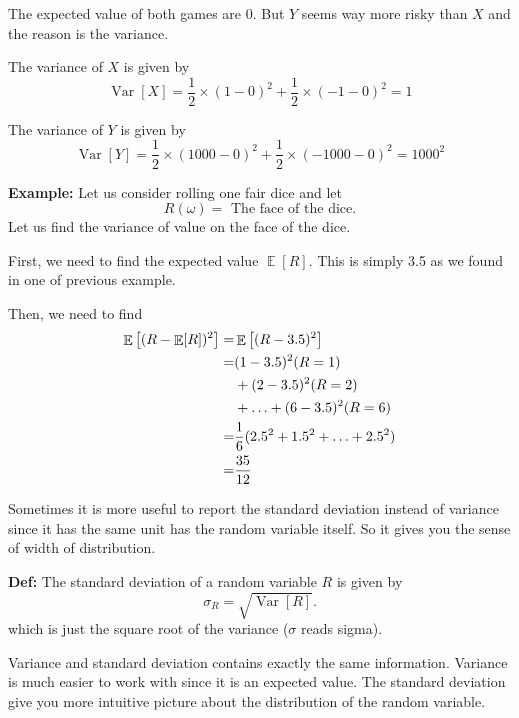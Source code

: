 \documentclass[a4paper, 12pt]{article}
\newcommand{\half}{\ensuremath{\frac{1}{2}}}
\newcommand{\definition}{\vspace{1em}\noindent\textbf{Def:} }
\newcommand{\example}{\vspace{1em}\noindent\textbf{Example:} }
\let\Pr\relax
\DeclareMathOperator{\Pr}{Pr}
\DeclareMathOperator{\E}{\mathbb{E}}
\DeclareMathOperator{\Var}{Var}
\begin{document}
\begin{multicols}{2}
\begin{center}
\end{center}

The expected value of both games are 0. But $Y$ seems way more risky than $X$ and the reason is the variance.

The variance of $X$ is given by
\[
	\Var[X] = \half \times (1-0)^2 + \half \times (-1-0)^2 = 1
\]

The variance of $Y$ is given by
\[
	\Var[Y] = \half \times (1000-0)^2 + \half \times (-1000-0)^2 = 1000^2
\]


\example Let us consider rolling one fair dice and let
\[
	R(\omega) = \text{ The face of the dice.}
\]
Let us find the variance of value on the face of the dice.

First, we need to find the expected value $\E[R]$. This is simply 3.5 as we found in one of previous example.

Then, we need to find
\begin{align*}
	\E\left[(R - \E[R])^2\right] =& \E\left[(R - 3.5)^2\right]\\
	=& (1-3.5)^2 \Pr(R=1)  \\
	&+(2-3.5)^2 \Pr(R=2)  \\
	&+\ldots + (6-3.5)^2 \Pr(R=6)\\
	=& \frac{1}{6} (2.5^2 + 1.5^2 + \ldots + 2.5^2)\\
	= & \frac{35}{12}
\end{align*}

Sometimes it is more useful to report the standard deviation instead of variance since it has the same unit has the random variable itself. So it gives you the sense of width of distribution.

\definition The standard deviation of a random variable $R$ is given by
\[
	\sigma_R = \sqrt{\Var[R]}.
\]
which is just the square root of the variance ($\sigma$ reads sigma).

Variance and standard deviation contains exactly the same information. Variance is much easier to work with since it is an expected value. The standard deviation give you more intuitive picture about the distribution of the random variable.



\end{multicols}
\end{document}
